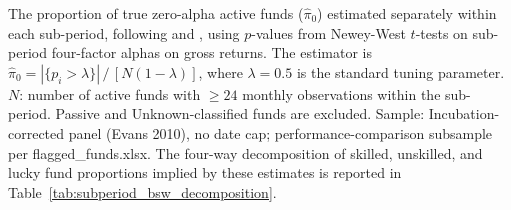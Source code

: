 \begin{table}[!htbp]
\centering
{}
\setlength{\tabletempwidth}{\wd\tabletempbox}
\ifdim\tabletempwidth>\linewidth\setlength{\tabletempwidth}{\linewidth}\fi
\begin{minipage}{\tabletempwidth}
\captionsetup{width=\linewidth}
\caption{\label{tab:subperiod_pi0_estimate}Aggregate Skill Estimate by Sub-Period: Proportion of True Zero-Alpha Active Funds}
\ifdim\wd\tabletempbox>\linewidth
  \resizebox{\linewidth}{!}{\usebox{\tabletempbox}}
\else
  \usebox{\tabletempbox}
\fi
\par\medskip
\begin{singlespace}\footnotesize\noindent
The proportion of true zero-alpha active funds ($\hat{\pi}_0$) estimated separately within each sub-period, following \textcite{Storey2002} and \textcite{BarrasScailletWermers2010}, using $p$-values from Newey-West $t$-tests on sub-period \textcite{Carhart1997} four-factor alphas on gross returns. The estimator is $\hat{\pi}_0 = |\{p_i > \lambda\}| \,/\, [N(1-\lambda)]$, where $\lambda = 0.5$ is the standard tuning parameter. $N$: number of active funds with $\geq 24$ monthly observations within the sub-period. Passive and Unknown-classified funds are excluded. Sample: Incubation-corrected panel (Evans 2010), no date cap; performance-comparison subsample per flagged\_funds.xlsx. The four-way decomposition of skilled, unskilled, and lucky fund proportions implied by these estimates is reported in Table~\ref{tab:subperiod_bsw_decomposition}.
\end{singlespace}
\end{minipage}
\end{table}

